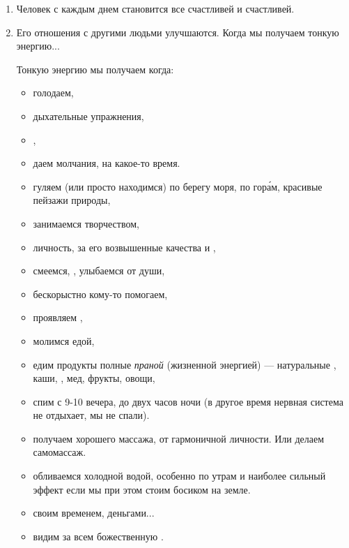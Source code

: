 \begin{enumerate}[noitemsep]
    \item Человек с каждым днем становится все счастливей и счастливей.
    \item Его отношения с другими людьми улучшаются. Когда мы получаем тонкую энергию...

          Тонкую энергию мы получаем когда:
          \begin{itemize}[noitemsep, label=+]
              \item голодаем,
              \item {} дыхательные упражнения,
              \item {},
              \item даем  молчания, на какое-то время.
              \item гуляем (или просто находимся) по берегу моря, по гор\'{а}м,  красивые пейзажи природы,
              \item занимаемся  творчеством,
              \item {}  личность, за его возвышенные качества и ,
              \item смеемся, , улыбаемся от души,
              \item бескорыстно кому-то помогаем,
              \item проявляем ,
              \item молимся  едой,
              \item едим продукты полные \textit{праной} (жизненной энергией) --- натуральные , каши, , мед, фрукты, овощи,
              \item спим с 9-10 вечера, до двух часов ночи (в другое время нервная система не отдыхает,  мы не спали).
              \item получаем  хорошего массажа, от гармоничной личности. Или делаем самомассаж.
              \item обливаемся холодной водой, особенно по утрам и наиболее сильный эффект если мы при этом стоим босиком на земле.
              \item {} своим временем, деньгами...
              \item видим за всем божественную .
          \end{itemize}
\end{enumerate}


